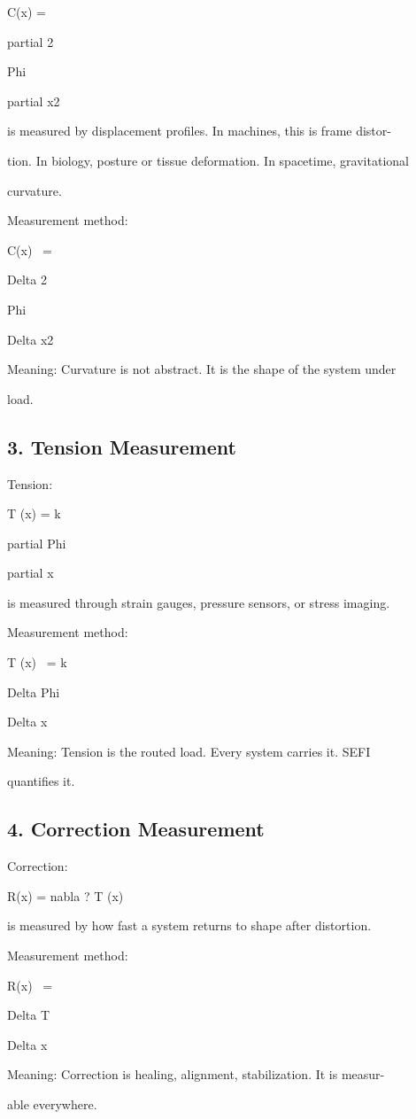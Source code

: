 \documentclass[10pt]{article}
\begin{document}
C(x) =

partial 2

Phi

partial x2

is measured by displacement profiles. In machines, this is frame distor-

tion. In biology, posture or tissue deformation. In spacetime, gravitational

curvature.

Measurement method:

C(x) ~=

Delta 2

Phi

Delta x2

Meaning: Curvature is not abstract. It is the shape of the system under

load.

\subsection*{3. Tension Measurement}
Tension:

T (x) = k

partial Phi

partial x

is measured through strain gauges, pressure sensors, or stress imaging.

Measurement method:

T (x) ~= k

Delta Phi

Delta x

Meaning: Tension is the routed load. Every system carries it. SEFI

quantifies it.

\subsection*{4. Correction Measurement}
Correction:

R(x) = nabla  ? T (x)

is measured by how fast a system returns to shape after distortion.

Measurement method:


R(x) ~=

Delta T

Delta x

Meaning: Correction is healing, alignment, stabilization. It is measur-

able everywhere.
\end{document}
